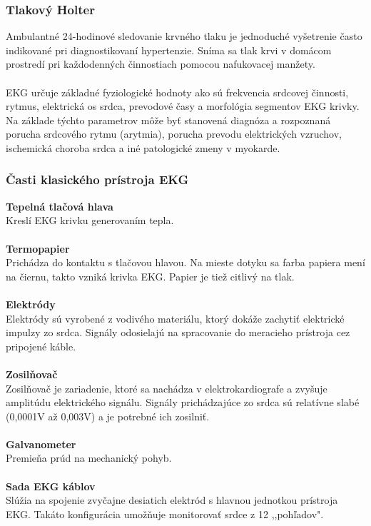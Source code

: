 \documentclass[titlepage]{article}
\begin{document}
\subsubsection*{Tlakový Holter}
Ambulantné 24-hodinové sledovanie krvného tlaku je jednoduché vyšetrenie často indikované pri diagnostikovaní hypertenzie. Sníma sa tlak krvi v domácom prostredí pri každodenných činnostiach pomocou nafukovacej manžety.
\\
\\
EKG určuje základné fyziologické hodnoty ako sú frekvencia srdcovej činnosti, rytmus, elektrická os srdca, prevodové časy a morfológia segmentov EKG krivky. Na základe týchto parametrov môže byť stanovená diagnóza a rozpoznaná porucha srdcového rytmu (arytmia), porucha prevodu elektrických vzruchov, ischemická choroba srdca a iné patologické zmeny v myokarde.


\newpage


\subsubsection{Časti klasického prístroja EKG}

\textbf{Tepelná tlačová hlava}
\\
Kreslí EKG krivku generovaním tepla.
\\
\\
\textbf{Termopapier}
\\
Prichádza do kontaktu s tlačovou hlavou. Na mieste dotyku sa farba papiera mení na čiernu, takto vzniká krivka EKG. Papier je tiež citlivý na tlak.
\\
\\
\textbf{Elektródy}
\\
Elektródy sú vyrobené z vodivého materiálu, ktorý dokáže zachytiť elektrické impulzy zo srdca. Signály odosielajú na spracovanie do meracieho prístroja cez pripojené káble.
\\
\\
\textbf{Zosilňovač}
\\
Zosilňovač je zariadenie, ktoré sa nachádza v elektrokardiografe a zvyšuje amplitúdu elektrického signálu. Signály prichádzajúce zo srdca sú relatívne slabé (0,0001V až 0,003V) a je potrebné ich zosilniť.
\\
\\
\textbf{Galvanometer}
\\
Premieňa prúd na mechanický pohyb.
\\
\\
\textbf{Sada EKG káblov}
\\
Slúžia na spojenie zvyčajne desiatich elektród s hlavnou jednotkou prístroja EKG. Takáto konfigurácia umožňuje monitorovať srdce z 12 ,,pohľadov".
\end{document}
